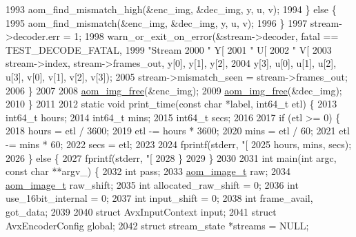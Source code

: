 \begin{DoxyCodeInclude}
{{{{{{{{{{{{{{{{{{{{{{{{{{{{{{{{{{{{{{{{{{{{1993       aom\_find\_mismatch\_high(&enc\_img, &dec\_img, y, u, v);
1994     \} \textcolor{keywordflow}{else} \{
1995       aom\_find\_mismatch(&enc\_img, &dec\_img, y, u, v);
1996     \}
1997     stream->decoder.err = 1;
1998     warn\_or\_exit\_on\_error(&stream->decoder, fatal == TEST\_DECODE\_FATAL,
1999                           \textcolor{stringliteral}{"Stream %
2000                           \textcolor{stringliteral}{" Y[%
2001                           \textcolor{stringliteral}{" U[%
2002                           \textcolor{stringliteral}{" V[%
2003                           stream->index, stream->frames\_out, y[0], y[1], y[2],
2004                           y[3], u[0], u[1], u[2], u[3], v[0], v[1], v[2], v[3]);
2005     stream->mismatch\_seen = stream->frames\_out;
2006   \}
2007 
2008   \hyperlink{aom__image_8h_afff22f7f3eb9409c5b678d1962f110a8}{aom\_img\_free}(&enc\_img);
2009   \hyperlink{aom__image_8h_afff22f7f3eb9409c5b678d1962f110a8}{aom\_img\_free}(&dec\_img);
2010 \}
2011 
2012 \textcolor{keyword}{static} \textcolor{keywordtype}{void} print\_time(\textcolor{keyword}{const} \textcolor{keywordtype}{char} *label, int64\_t etl) \{
2013   int64\_t hours;
2014   int64\_t mins;
2015   int64\_t secs;
2016 
2017   \textcolor{keywordflow}{if} (etl >= 0) \{
2018     hours = etl / 3600;
2019     etl -= hours * 3600;
2020     mins = etl / 60;
2021     etl -= mins * 60;
2022     secs = etl;
2023 
2024     fprintf(stderr, \textcolor{stringliteral}{"[%
2025             hours, mins, secs);
2026   \} \textcolor{keywordflow}{else} \{
2027     fprintf(stderr, \textcolor{stringliteral}{"[%
2028   \}
2029 \}
2030 
2031 \textcolor{keywordtype}{int} main(\textcolor{keywordtype}{int} argc, \textcolor{keyword}{const} \textcolor{keywordtype}{char} **argv\_) \{
2032   \textcolor{keywordtype}{int} pass;
2033   \hyperlink{structaom__image}{aom\_image\_t} raw;
2034   \hyperlink{structaom__image}{aom\_image\_t} raw\_shift;
2035   \textcolor{keywordtype}{int} allocated\_raw\_shift = 0;
2036   \textcolor{keywordtype}{int} use\_16bit\_internal = 0;
2037   \textcolor{keywordtype}{int} input\_shift = 0;
2038   \textcolor{keywordtype}{int} frame\_avail, got\_data;
2039 
2040   \textcolor{keyword}{struct }AvxInputContext input;
2041   \textcolor{keyword}{struct }AvxEncoderConfig global;
2042   \textcolor{keyword}{struct }stream\_state *streams = NULL;
}}}}}}}}}}}}}}}}}}}}}}}}}}}}}}}}}}}}}}}}}}}}}}}}}}
\end{DoxyCodeInclude}
